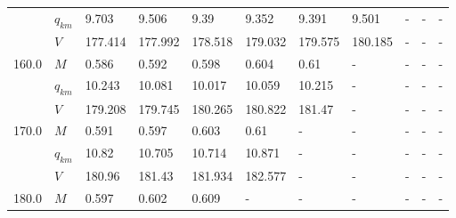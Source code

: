 \begin{tabular}{|l|l|lllllllll|}
      & $q_{km}$ &                     9.703 &                     9.506 &                      9.39 &    9.352\cellcolor{green} &                     9.391 &                     9.501 &                         - &                         - &                         - \\
      & $V$ &                   177.414 &                   177.992 &                   178.518 &  179.032\cellcolor{green} &                   179.575 &                   180.185 &                         - &                         - &                         - \\
\hline
160.0 & $M$ &                     0.586 &                     0.592 &    0.598\cellcolor{green} &                     0.604 &                      0.61 &                         - &                         - &                         - &                         - \\
      & $q_{km}$ &                    10.243 &                    10.081 &   10.017\cellcolor{green} &                    10.059 &                    10.215 &                         - &                         - &                         - &                         - \\
      & $V$ &                   179.208 &                   179.745 &  180.265\cellcolor{green} &                   180.822 &                    181.47 &                         - &                         - &                         - &                         - \\
\hline
170.0 & $M$ &                     0.591 &    0.597\cellcolor{green} &                     0.603 &                      0.61 &                         - &                         - &                         - &                         - &                         - \\
      & $q_{km}$ &                     10.82 &   10.705\cellcolor{green} &                    10.714 &                    10.871 &                         - &                         - &                         - &                         - &                         - \\
      & $V$ &                    180.96 &   181.43\cellcolor{green} &                   181.934 &                   182.577 &                         - &                         - &                         - &                         - &                         - \\
\hline
180.0 & $M$ &                     0.597 &    0.602\cellcolor{green} &                     0.609 &                         - &                         - &                         - &                         - &                         - &                         - \\

\end{tabular}
